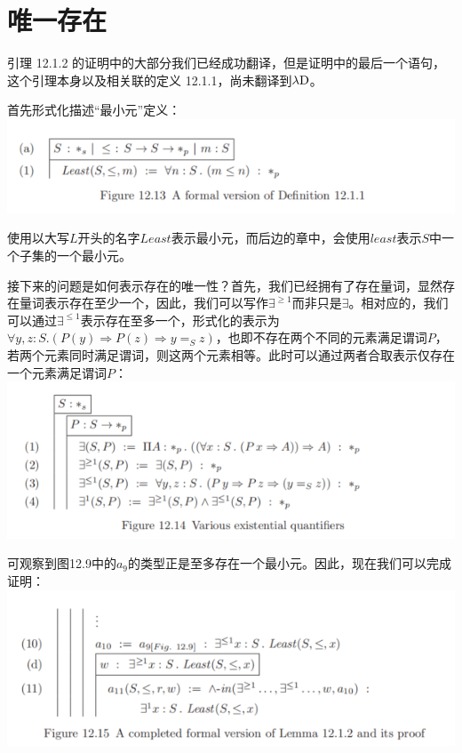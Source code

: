 \documentclass[UTF8]{article}
\begin{document}
	\section{唯一存在}
	\noindent
	引理 12.1.2 的证明中的大部分我们已经成功翻译，但是证明中的最后一个语句，这个引理本身以及相关联的定义 12.1.1，尚未翻译到$\lambda{\rm D}$。
	
		首先形式化描述“最小元”定义：\\
		\includegraphics[width=0.93\linewidth]{"../imgs/12-11.png"}
		
		使用以大写$L$开头的名字$Least$表示最小元，而后边的章中，会使用$least$表示$S$中一个子集的一个最小元。
		
		接下来的问题是如何表示存在的唯一性？首先，我们已经拥有了存在量词，显然存在量词表示存在至少一个，因此，我们可以写作$\exists^{\ge 1}$而非只是$\exists$。相对应的，我们可以通过$\exists^{\le 1}$表示存在至多一个，形式化的表示为$\forall y,z:S.(P(y)\Rightarrow P(z)\Rightarrow y=_S z)$，也即不存在两个不同的元素满足谓词$P$，若两个元素同时满足谓词，则这两个元素相等。此时可以通过两者合取表示仅存在一个元素满足谓词$P$：\\
		\includegraphics[width=0.93\linewidth]{"../imgs/12-12.png"}
		
		可观察到图12.9中的$a_9$的类型正是至多存在一个最小元。因此，现在我们可以完成证明：\\
		\includegraphics[width=0.93\linewidth]{"../imgs/12-13.png"}
		
\end{document}
